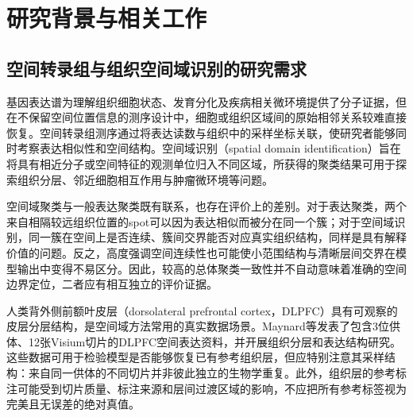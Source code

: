 \section{研究背景与相关工作}
\label{sec:cc-background-rewrite-v1}

\subsection{空间转录组与组织空间域识别的研究需求}
\label{subsec:cc-st-background-v1}

基因表达谱为理解组织细胞状态、发育分化及疾病相关微环境提供了分子证据，但在不保留空间位置信息的测序设计中，细胞或组织区域间的原始相邻关系较难直接恢复。空间转录组测序通过将表达读数与组织中的采样坐标关联，使研究者能够同时考察表达相似性和空间结构。空间域识别（spatial domain identification）旨在将具有相近分子或空间特征的观测单位归入不同区域，所获得的聚类结果可用于探索组织分层、邻近细胞相互作用与肿瘤微环境等问题。

空间域聚类与一般表达聚类既有联系，也存在评价上的差别。对于表达聚类，两个来自相隔较远组织位置的spot可以因为表达相似而被分在同一个簇；对于空间域识别，同一簇在空间上是否连续、簇间交界能否对应真实组织结构，同样是具有解释价值的问题。反之，高度强调空间连续性也可能使小范围结构与清晰层间交界在模型输出中变得不易区分。因此，较高的总体聚类一致性并不自动意味着准确的空间边界定位，二者应有相互独立的评价证据。

人类背外侧前额叶皮层（dorsolateral prefrontal cortex，DLPFC）具有可观察的皮层分层结构，是空间域方法常用的真实数据场景。Maynard等发表了包含3位供体、12张Visium切片的DLPFC空间表达资料，并开展组织分层和表达结构研究\cite{maynard2021}。这些数据可用于检验模型是否能够恢复已有参考组织层，但应特别注意其采样结构：来自同一供体的不同切片并非彼此独立的生物学重复。此外，组织层的参考标注可能受到切片质量、标注来源和层间过渡区域的影响，不应把所有参考标签视为完美且无误差的绝对真值。

